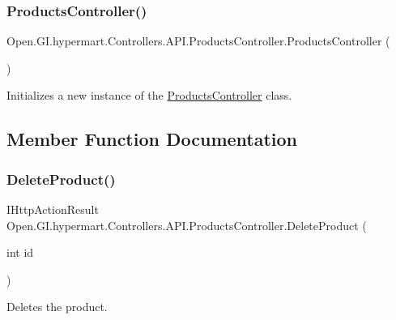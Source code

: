 \subsubsection{\texorpdfstring{Products\+Controller()}{ProductsController()}}
{\footnotesize\ttfamily Open.\+G\+I.\+hypermart.\+Controllers.\+A\+P\+I.\+Products\+Controller.\+Products\+Controller (\begin{DoxyParamCaption}{ }\end{DoxyParamCaption})}



Initializes a new instance of the \hyperlink{class_open_1_1_g_i_1_1hypermart_1_1_controllers_1_1_a_p_i_1_1_products_controller}{Products\+Controller} class. 



\subsection{Member Function Documentation}
\hypertarget{class_open_1_1_g_i_1_1hypermart_1_1_controllers_1_1_a_p_i_1_1_products_controller_a0c7c45df129f67ada9c5cac65ddd01a3}{}\label{class_open_1_1_g_i_1_1hypermart_1_1_controllers_1_1_a_p_i_1_1_products_controller_a0c7c45df129f67ada9c5cac65ddd01a3} 
\subsubsection{\texorpdfstring{Delete\+Product()}{DeleteProduct()}}
{\footnotesize\ttfamily I\+Http\+Action\+Result Open.\+G\+I.\+hypermart.\+Controllers.\+A\+P\+I.\+Products\+Controller.\+Delete\+Product (\begin{DoxyParamCaption}\item[{int}]{id }\end{DoxyParamCaption})}



Deletes the product. 


